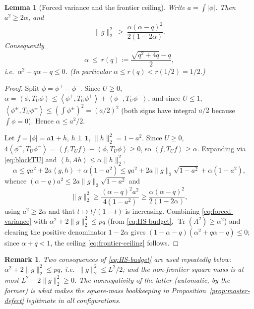 \documentclass[11pt]{article}
\newtheorem{lemma}[theorem]{Lemma}
\newtheorem{remark}[theorem]{Remark}
\newcommand{\one}{\mathbf 1}
\newcommand{\ip}[2]{\left\langle #1,#2\right\rangle}
\newcommand{\Tr}{\operatorname{Tr}}
\begin{document}
\begin{lemma}[Forced variance and the frontier ceiling]\label{lem:forced-variance}
Write $a=\int|\phi|$.  Then $a^2\ge2\alpha$, and
\begin{equation}\label{eq:forced-variance}
        \|g\|_2^2\ \ge\ \frac{\alpha(\alpha-q)^2}{2(1-2\alpha)} .
\end{equation}
Consequently
\begin{equation}\label{eq:frontier-ceiling}
        \alpha\ \le\ r(q):=\frac{\sqrt{q^2+4q}-q}{2},
\end{equation}
i.e.\ $\alpha^2+q\alpha-q\le0$.  (In particular $\alpha\le r(q)<r(1/2)=1/2$.)
\end{lemma}

\begin{proof}
Split $\phi=\phi^+-\phi^-$.  Since $U\ge0$,
$\alpha=\ip{\phi}{T_U\phi}\le\ip{\phi^+}{T_U\phi^+}+\ip{\phi^-}{T_U\phi^-}$,
and since $U\le1$, $\ip{\phi^\pm}{T_U\phi^\pm}\le(\int\phi^\pm)^2=(a/2)^2$
(both signs have integral $a/2$ because $\int\phi=0$).  Hence $\alpha\le a^2/2$.

Let $f=|\phi|=a\one+h$, $h\perp\one$, $\|h\|_2^2=1-a^2$.  Since $U\ge0$,
$4\ip{\phi^+}{T_U\phi^-}=\ip f{T_Uf}-\ip\phi{T_U\phi}\ge0$, so
$\ip f{T_Uf}\ge\alpha$.  Expanding via \eqref{eq:blockTU} and
$\ip h{Ah}\le\alpha\|h\|_2^2$,
\[
        \alpha\le qa^2+2a\ip gh+\alpha(1-a^2)
        \le qa^2+2a\|g\|_2\sqrt{1-a^2}+\alpha(1-a^2),
\]
whence $(\alpha-q)a^2\le2a\|g\|_2\sqrt{1-a^2}$ and
\[
        \|g\|_2^2\ge\frac{(\alpha-q)^2a^2}{4(1-a^2)}
        \ge\frac{\alpha(\alpha-q)^2}{2(1-2\alpha)},
\]
using $a^2\ge2\alpha$ and that $t\mapsto t/(1-t)$ is increasing.
Combining \eqref{eq:forced-variance} with $\alpha^2+2\|g\|_2^2\le pq$ (from
\eqref{eq:HS-budget}, $\Tr(A^2)\ge\alpha^2$) and clearing the positive
denominator $1-2\alpha$ gives
$(1-\alpha-q)(\alpha^2+q\alpha-q)\le0$; since $\alpha+q<1$, the ceiling
\eqref{eq:frontier-ceiling} follows.
\end{proof}

\begin{remark}\label{rmk:budget-sign}
Two consequences of \eqref{eq:HS-budget} are used repeatedly below:
$\alpha^2+2\|g\|_2^2\le pq$, i.e.\ $\|g\|_2^2\le L^2/2$; and the non-frontier
square mass is at most $L^2-2\|g\|_2^2\ge0$.  The nonnegativity of the latter
(automatic, by the former) is what makes the square-mass bookkeeping in
Proposition~\ref{prop:master-defect} legitimate in all configurations.
\end{remark}
\end{document}
